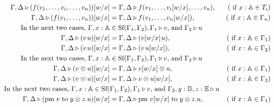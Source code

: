 \begin{definition}
\begin{align*}
  \hspace{-23pt} \Gamma, \Delta  \triangleright(f(v_1, \ldots,v_i,\ldots, v_n))[w/x] &= \Gamma, \Delta  \triangleright f(v_1, \ldots,v_i[w/x],\ldots, v_n),& (\text{ if } x: \mathbb{A} \in T_i)  \\
  \hspace{-23pt}\Gamma, \Delta  \triangleright(f(v_1, \ldots, v_n))[w/x] &= \Gamma, \Delta  \triangleright f(v_1, \ldots, v_n[w/x]),& (\text{ if } x: \mathbb{A} \in \Gamma_n)  \\
  \hspace{-23pt}\text{In the next two cases, }\Gamma,x: \mathbb{A} & \in \text{Sf}(\Gamma_1,\Gamma_2), \Gamma_1 \triangleright v \text{, and } \Gamma_2 \triangleright u  \\
  \hspace{-23pt}\Gamma, \Delta  \triangleright (v \hspace{1pt}  u)[w/x] &= \Gamma, \Delta  \triangleright (v[w/x] \hspace{1pt} u), & (\text{ if } x: \mathbb{A} \in \Gamma_1)\\
  \hspace{-23pt}\Gamma, \Delta  \triangleright (v \hspace{1pt}  u)[w/x] &= \Gamma, \Delta  \triangleright (v \hspace{1pt} u[w/x]), & (\text{ if } x: \mathbb{A} \in \Gamma_2)\\
  \hspace{-23pt}\text{In the next two cases, }\Gamma,x: \mathbb{A} & \in \text{Sf}(\Gamma_1,\Gamma_2), \Gamma_1 \triangleright v \text{, and } \Gamma_2 \triangleright u  \\
  \hspace{-23pt}\Gamma, \Delta  \triangleright (v \otimes u)[w/x] &= \Gamma, \Delta  \triangleright v[w/x] \otimes u, & (\text{ if } x: \mathbb{A} \in \Gamma_1)\\ 
  \hspace{-23pt}\Gamma, \Delta  \triangleright (v \otimes u)[w/x] &= \Gamma, \Delta  \triangleright v \otimes u[w/x], & (\text{ if } x: \mathbb{A} \in \Gamma_2)\\
  \hspace{-23pt}\text{In the next two cases, }\Gamma,x: \mathbb{A}  \in \text{Sf}(&\Gamma_1,\Gamma_2), \Gamma_1 \triangleright v \text{, and } \Gamma_2, y: \mathbb{D}, z:\mathbb{E} \triangleright u  \\
  \hspace{-23pt} \Gamma, \Delta  \triangleright (\text{pm} \hspace{3 pt} v \hspace{3 pt} \text{to} \hspace{3 pt} y \otimes z. u)[w/x] &= \Gamma, \Delta  \triangleright \text{pm} \hspace{3 pt} v[w/x] \hspace{3 pt} \text{to} \hspace{3 pt} y \otimes z. u,  &  (\text{ if } x: \mathbb{A} \in \Gamma_1) \\

\end{align*}
\end{definition}
